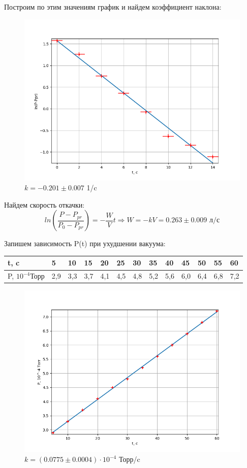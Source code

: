 \documentclass[12pt]{article}
\begin{document}
Построим по этим значениям график и найдем коэффициент наклона:
\begin{figure}
	\centering
	\includegraphics[scale=0.7]{./images/better1.png}
	\caption{ $k = -0.201 \pm 0.007$ 1/c}
\end{figure}

Найдем скорость откачки:
\begin{equation*}
	ln(\frac{P-P_{pr}}{P_0-P_{pr}}) = -\frac{W}{V}t \Rightarrow
	W = -kV = 0.263 \pm 0.009\text{ л/с}
\end{equation*}

Запишем зависимость P(t) при ухудшении вакуума:
\begin{table}[H]
	\centering
	\begin{tabular}{|l|l|l|l|l|l|l|l|l|l|l|l|l|}
		\hline
		t, c             & 5   & 10  & 15  & 20  & 25  & 30  & 35  & 40  & 45  & 50  & 55  & 60  \\ \hline
		P, $10^{-4}$Торр & 2,9 & 3,3 & 3,7 & 4,1 & 4,5 & 4,8 & 5,2 & 5,6 & 6,0 & 6,4 & 6,8 & 7,2 \\ \hline
	\end{tabular}
\end{table}

\begin{figure}
	\centering
	\includegraphics[scale=0.7]{./images/worst1.png}
	\caption{ $k = (0.0775 \pm 0.0004) \cdot 10^{-4}$ Торр/c}
\end{figure}
\end{document}
